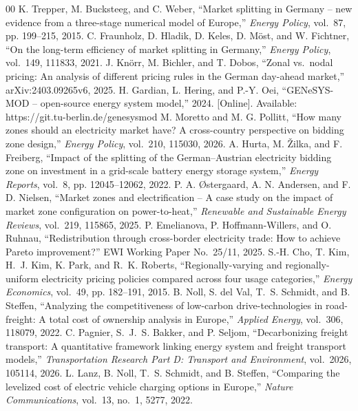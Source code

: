 \documentclass[conference]{IEEEtran}
\begin{document}
\begin{thebibliography}{00}
 K. Trepper, M. Bucksteeg, and C. Weber, ``Market splitting in Germany -- new evidence from a three-stage numerical model of Europe,'' \emph{Energy Policy}, vol.~87, pp. 199--215, 2015.
 C. Fraunholz, D. Hladik, D. Keles, D. M\"ost, and W. Fichtner, ``On the long-term efficiency of market splitting in Germany,'' \emph{Energy Policy}, vol.~149, 111833, 2021.
 J. Kn\"orr, M. Bichler, and T. Dobos, ``Zonal vs.\ nodal pricing: An analysis of different pricing rules in the German day-ahead market,'' arXiv:2403.09265v6, 2025.
 H. Gardian, L. Hering, and P.-Y. Oei, ``GENeSYS-MOD -- open-source energy system model,'' 2024. [Online]. Available: https://git.tu-berlin.de/genesysmod
 M. Moretto and M. G. Pollitt, ``How many zones should an electricity market have? A cross-country perspective on bidding zone design,'' \emph{Energy Policy}, vol.~210, 115030, 2026.
 A. Hurta, M. \v{Z}ilka, and F. Freiberg, ``Impact of the splitting of the German--Austrian electricity bidding zone on investment in a grid-scale battery energy storage system,'' \emph{Energy Reports}, vol.~8, pp. 12045--12062, 2022.
 P. A. \O stergaard, A. N. Andersen, and F. D. Nielsen, ``Market zones and electrification -- A case study on the impact of market zone configuration on power-to-heat,'' \emph{Renewable and Sustainable Energy Reviews}, vol.~219, 115865, 2025.
 P. Emelianova, P. Hoffmann-Willers, and O. Ruhnau, ``Redistribution through cross-border electricity trade: How to achieve Pareto improvement?'' EWI Working Paper No.~25/11, 2025.
 S.-H. Cho, T. Kim, H.~J. Kim, K. Park, and R.~K. Roberts, ``Regionally-varying and regionally-uniform electricity pricing policies compared across four usage categories,'' \emph{Energy Economics}, vol.~49, pp. 182--191, 2015.
 B. Noll, S. del Val, T.~S. Schmidt, and B. Steffen, ``Analyzing the competitiveness of low-carbon drive-technologies in road-freight: A total cost of ownership analysis in Europe,'' \emph{Applied Energy}, vol.~306, 118079, 2022.
 C. Pagnier, S.~J.~S. Bakker, and P. Seljom, ``Decarbonizing freight transport: A quantitative framework linking energy system and freight transport models,'' \emph{Transportation Research Part D: Transport and Environment}, vol.~2026, 105114, 2026.
 L. Lanz, B. Noll, T.~S. Schmidt, and B. Steffen, ``Comparing the levelized cost of electric vehicle charging options in Europe,'' \emph{Nature Communications}, vol.~13, no.~1, 5277, 2022.

\end{thebibliography}
\end{document}
